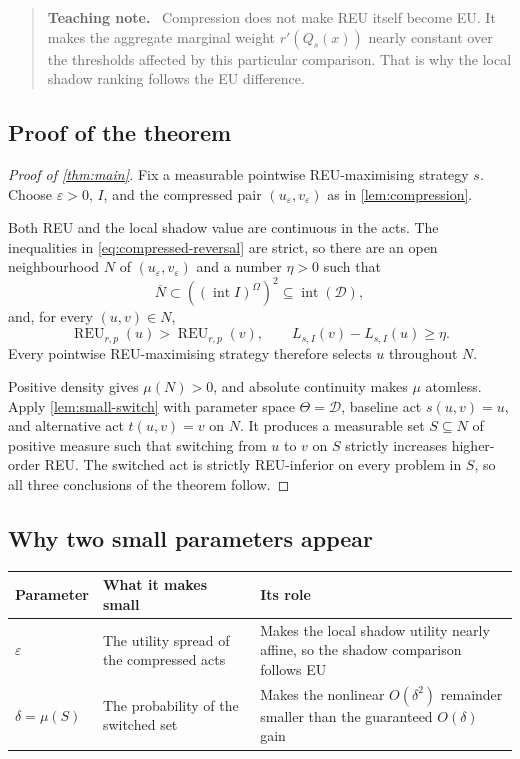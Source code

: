 \documentclass[11pt,a4paper]{article}
\theoremstyle{definition}
\newcommand{\REU}{\operatorname{REU}}
\newcommand{\D}{\mathcal D}
\newenvironment{teachingnote}
  {\begin{quote}\color{BrickRed}\textbf{Teaching note.}\ }
  {\end{quote}}
\begin{document}
\begin{teachingnote}
Compression does not make REU itself become EU. It makes the aggregate
marginal weight $r'(Q_s(x))$ nearly constant over the thresholds affected by
this particular comparison. That is why the local shadow ranking follows the
EU difference.
\end{teachingnote}

\subsection{Proof of the theorem}

\begin{proof}[Proof of \cref{thm:main}]
Fix a measurable pointwise REU-maximising strategy $s$. Choose
$\varepsilon>0$, $I$, and the compressed pair
$(u_\varepsilon,v_\varepsilon)$ as in \cref{lem:compression}.

Both REU and the local shadow value are continuous in the acts. The
inequalities in \eqref{eq:compressed-reversal} are strict, so there are an
open neighbourhood $N$ of $(u_\varepsilon,v_\varepsilon)$ and a number
$\eta>0$ such that
\[
 \overline N\subset
 ((\operatorname{int} I)^\Omega)^2
 \subseteq\operatorname{int}(\D),
\]
and, for every $(u,v)\in N$,
\begin{equation}\label{eq:uniform-reversal}
 \REU_{r,p}(u)>\REU_{r,p}(v),
 \qquad
 L_{s,I}(v)-L_{s,I}(u)\geq\eta.
\end{equation}
Every pointwise REU-maximising strategy therefore selects $u$ throughout
$N$.

Positive density gives $\mu(N)>0$, and absolute continuity makes $\mu$
atomless. Apply \cref{lem:small-switch} with parameter space $\Theta=\D$,
baseline act $s(u,v)=u$, and alternative act $t(u,v)=v$ on $N$. It produces a
measurable set $S\subseteq N$ of positive measure such that switching from
$u$ to $v$ on $S$ strictly increases higher-order REU. The switched act is
strictly REU-inferior on every problem in $S$, so all three conclusions of the
theorem follow.
\end{proof}

\subsection{Why two small parameters appear}

\begin{center}
\renewcommand{\arraystretch}{1.25}
\begin{tabularx}{\textwidth}{>{\bfseries}p{}XX}
\toprule
Parameter & What it makes small & Its role \\
\midrule
$\varepsilon$ & The utility spread of the compressed acts & Makes the local shadow utility nearly affine, so the shadow comparison follows EU \\
$\delta=\mu(S)$ & The probability of the switched set & Makes the nonlinear $O(\delta^2)$ remainder smaller than the guaranteed $O(\delta)$ gain \\
\bottomrule
\end{tabularx}
\end{center}
\end{document}

